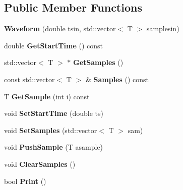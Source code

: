 \subsection*{Public Member Functions}
\begin{DoxyCompactItemize}
\item 
\hypertarget{classWaveform_a81db85928560a50ed0bde260b86aa43a}{{\bfseries Waveform} (double tsin, std\-::vector$<$ T $>$ samplesin)}\label{classWaveform_a81db85928560a50ed0bde260b86aa43a}

\item 
\hypertarget{classWaveform_abb0cebd383b7cfeb84169acb75dd3cc6}{double {\bfseries Get\-Start\-Time} () const }\label{classWaveform_abb0cebd383b7cfeb84169acb75dd3cc6}

\item 
\hypertarget{classWaveform_a4f146530e8336f402b1d47a2b1b0fae8}{std\-::vector$<$ T $>$ $\ast$ {\bfseries Get\-Samples} ()}\label{classWaveform_a4f146530e8336f402b1d47a2b1b0fae8}

\item 
\hypertarget{classWaveform_ac43b148d094b815f0eab3e516a0159c3}{const std\-::vector$<$ T $>$ \& {\bfseries Samples} () const }\label{classWaveform_ac43b148d094b815f0eab3e516a0159c3}

\item 
\hypertarget{classWaveform_a93fd6a1de144622e55fa1144159fd8da}{T {\bfseries Get\-Sample} (int i) const }\label{classWaveform_a93fd6a1de144622e55fa1144159fd8da}

\item 
\hypertarget{classWaveform_ad8b5b17cc6d44e528abdd97adead95d4}{void {\bfseries Set\-Start\-Time} (double ts)}\label{classWaveform_ad8b5b17cc6d44e528abdd97adead95d4}

\item 
\hypertarget{classWaveform_a5505b4a4e14e80edb335b71e3606d815}{void {\bfseries Set\-Samples} (std\-::vector$<$ T $>$ sam)}\label{classWaveform_a5505b4a4e14e80edb335b71e3606d815}

\item 
\hypertarget{classWaveform_a09d5b4af62453d4a2d0bdbc5c04d9961}{void {\bfseries Push\-Sample} (T asample)}\label{classWaveform_a09d5b4af62453d4a2d0bdbc5c04d9961}

\item 
\hypertarget{classWaveform_a9607cc7f4438c86663662ade5093f0f6}{void {\bfseries Clear\-Samples} ()}\label{classWaveform_a9607cc7f4438c86663662ade5093f0f6}

\item 
\hypertarget{classWaveform_a65c4764c140a15fbc60568465663fe39}{bool {\bfseries Print} ()}\label{classWaveform_a65c4764c140a15fbc60568465663fe39}

\end{DoxyCompactItemize}
